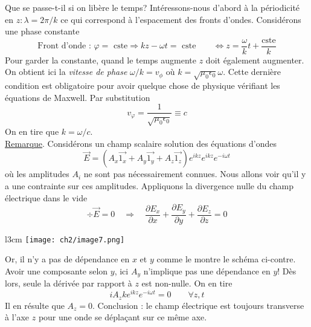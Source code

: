 Que se passe-t-il si on libère le temps? Intéressons-nous d'abord à la périodicité en 
$z : \lambda = 2\pi/k$ ce qui correspond à l'espacement des fronts d'ondes. Considérons 
une phase constante
\begin{equation}
\text{Front d'onde : } \varphi = \text{ cste} \Rightarrow  kz-\omega t = \text{ cste} \qquad 
\Longleftrightarrow z = \dfrac{\omega}{k}t+\dfrac{\text{cste}}{k}
\end{equation}
Pour garder la constante, quand le temps augmente $z$ doit également augmenter. On obtient 
ici la \textit{vitesse de phase} $\omega/k = v_\phi$ où $k = \sqrt{\mu_0\epsilon_0}\omega$. 
Cette dernière condition est obligatoire pour avoir quelque chose de physique vérifiant 
les équations de Maxwell. Par substitution
\begin{equation}
v_\varphi = \dfrac{1}{\sqrt{\mu_0\epsilon_0}} \equiv c
\end{equation}
On en tire que $k=\omega/c$.\\

\underline{Remarque}. Considérons un champ scalaire solution des équations d'ondes 
\begin{equation}
\vec{E} = (A_x\vec{1_x}+A_y\vec{1_y}+A_z\vec{1_z})e^{ikz}e^{ikz}e^{-i\omega t}
\end{equation}
où les amplitudes $A_i$ ne sont pas nécessairement connues. Nous allons voir qu'il y a 
une contrainte sur ces amplitudes. Appliquons la divergence nulle du champ électrique 
dans le vide
\begin{equation}
\div \vec{E} = 0 \quad \Longrightarrow\quad \dfrac{\partial E_x}{\partial x}+
\dfrac{\partial E_y}{\partial y} + \dfrac{\partial E_z}{\partial z} = 0
\end{equation}

\begin{wrapfigure}[6]{l}{3cm}
\vspace{-16mm}
\texttt{[image: ch2/image7.png]}
\end{wrapfigure}
Or, il n'y a pas de dépendance en $x$ et $y$ comme le montre le schéma ci-contre. Avoir 
une composante selon $y$, ici $A_y$ n'implique pas une dépendance en $y$! Dès lors, 
seule la dérivée par rapport à $z$ est non-nulle. On en tire
\begin{equation}
iA_zke^{ikz}e^{-i\omega t} = 0\qquad \forall z,t
\end{equation}
Il en résulte que $A_z = 0$. Conclusion : le champ électrique est toujours transverse à 
l'axe $z$ pour une onde se déplaçant sur ce même axe.\\

